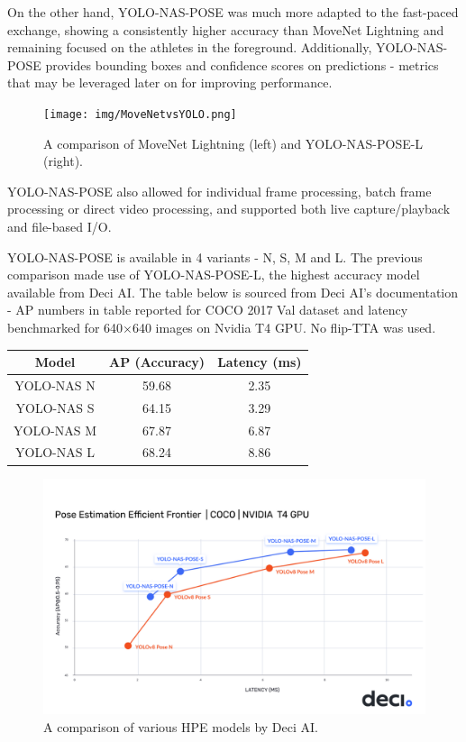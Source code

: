 \documentclass[a4paper, oneside, 11pt]{article}
\begin{document}
\bigskip
\noindent
On the other hand, YOLO-NAS-POSE was much more adapted to the fast-paced exchange, showing a consistently higher accuracy than MoveNet Lightning and remaining focused on the athletes in the foreground. Additionally, YOLO-NAS-POSE provides bounding boxes and confidence scores on predictions - metrics that may be leveraged later on for improving performance.

\bigskip
\begin{figure}[ht]
    \centering
    \texttt{[image: img/MoveNetvsYOLO.png]}
    \caption{A comparison of MoveNet Lightning (left) and YOLO-NAS-POSE-L (right).}
    \label{fig:comparingHPEmodels}
\end{figure}

\bigskip
\noindent
YOLO-NAS-POSE also allowed for individual frame processing, batch frame processing or direct video processing, and supported both live capture/playback and file-based I/O. 

\bigskip
\noindent
YOLO-NAS-POSE is available in 4 variants - N, S, M and L. The previous comparison made use of YOLO-NAS-POSE-L, the highest accuracy model available from Deci AI. The table below is sourced from Deci AI's documentation - AP numbers in table reported for COCO 2017 Val dataset and latency benchmarked for 640$\times$640 images on Nvidia T4 GPU. No flip-TTA was used. \cite{DeciAI}

\bigskip
\begin{center}
\begin{tabular}{|c c c|} 
 \hline
 \textbf{Model} & \textbf{AP (Accuracy)} & \textbf{Latency (ms)} \\ [0.5ex] 
 \hline
 YOLO-NAS N & 59.68 & 2.35 \\ 
 \hline
 YOLO-NAS S & 64.15 & 3.29 \\
 \hline
 YOLO-NAS M & 67.87 & 6.87 \\
 \hline
 YOLO-NAS L & 68.24 & 8.86 \\ 
 \hline
\end{tabular}
\end{center}

\begin{figure}[ht]
    \centering
    \includegraphics[scale = 0.35]{img/yolo_nas_pose_l.png}
    \caption{A comparison of various HPE models by Deci AI. \cite{DeciAI}}
    \label{fig:comparingYOLOModels}
\end{figure}
\end{document}
